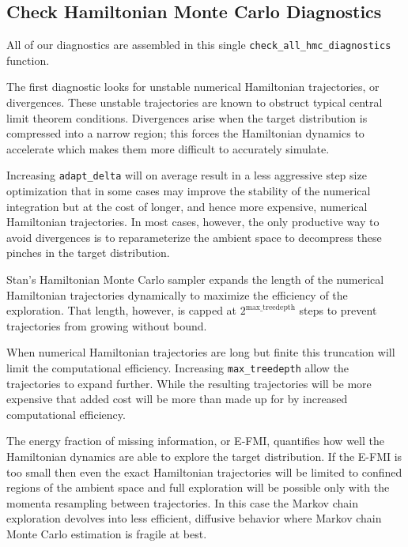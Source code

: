 \documentclass[
  letterpaper,
  DIV=11,
  numbers=noendperiod]{scrartcl}
\begin{document}
\hypertarget{check-hamiltonian-monte-carlo-diagnostics}{%
\subsection{Check Hamiltonian Monte Carlo
Diagnostics}\label{check-hamiltonian-monte-carlo-diagnostics}}

All of our diagnostics are assembled in this single
\texttt{check\_all\_hmc\_diagnostics} function.

The first diagnostic looks for unstable numerical Hamiltonian
trajectories, or divergences. These unstable trajectories are known to
obstruct typical central limit theorem conditions. Divergences arise
when the target distribution is compressed into a narrow region; this
forces the Hamiltonian dynamics to accelerate which makes them more
difficult to accurately simulate.

Increasing \texttt{adapt\_delta} will on average result in a less
aggressive step size optimization that in some cases may improve the
stability of the numerical integration but at the cost of longer, and
hence more expensive, numerical Hamiltonian trajectories. In most cases,
however, the only productive way to avoid divergences is to
reparameterize the ambient space to decompress these pinches in the
target distribution.

Stan's Hamiltonian Monte Carlo sampler expands the length of the
numerical Hamiltonian trajectories dynamically to maximize the
efficiency of the exploration. That length, however, is capped at
\(2^{\text{max\_treedepth}}\) steps to prevent trajectories from growing
without bound.

When numerical Hamiltonian trajectories are long but finite this
truncation will limit the computational efficiency. Increasing
\texttt{max\_treedepth} allow the trajectories to expand further. While
the resulting trajectories will be more expensive that added cost will
be more than made up for by increased computational efficiency.

The energy fraction of missing information, or E-FMI, quantifies how
well the Hamiltonian dynamics are able to explore the target
distribution. If the E-FMI is too small then even the exact Hamiltonian
trajectories will be limited to confined regions of the ambient space
and full exploration will be possible only with the momenta resampling
between trajectories. In this case the Markov chain exploration devolves
into less efficient, diffusive behavior where Markov chain Monte Carlo
estimation is fragile at best.
\end{document}
